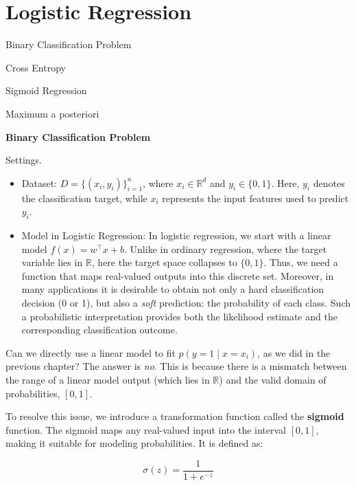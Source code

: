 \documentclass[../main]{subfiles}
\begin{document}
\chapter{Logistic Regression}
\begin{introduction}
\item Binary Classification Problem
\item Cross Entropy
\item Sigmoid Regression
\item Maximum a posteriori
\end{introduction}
\begin{example}
  \textbf{Binary Classification Problem}
\end{example}
Settings.
\begin{itemize}
  \item Dataset: $D=\{(x_i,y_i)\}_{i=1}^n$, where $x_i\in\mathbb{R}^d$ and $y_i\in\{0,1\}$.  
  Here, $y_i$ denotes the classification target, while $x_i$ represents the input features used to predict $y_i$.
  \item Model in Logistic Regression: In logistic regression, we start with a linear model $f(x) = w^\top x + b$.
  Unlike in ordinary regression, where the target variable lies in $\mathbb{R}$, here the target space collapses to $\{0,1\}$. Thus, we need a function that maps real-valued outputs into this discrete set. Moreover, in many applications it is desirable to obtain not only a hard classification decision (0 or 1), but also a \emph{soft} prediction: the probability of each class. Such a probabilistic interpretation provides both the likelihood estimate and the corresponding classification outcome.
\end{itemize}
Can we directly use a linear model to fit $p(y=1 \mid x=x_i)$, as we did in the previous chapter? The answer is \emph{no}. This is because there is a mismatch between the range of a linear model output (which lies in $\mathbb{R}$) and the valid domain of probabilities, $[0,1]$. 

To resolve this issue, we introduce a transformation function called the \textbf{sigmoid} function. The sigmoid maps any real-valued input into the interval $[0,1]$, making it suitable for modeling probabilities. It is defined as:
\begin{definition}
  \begin{equation}
    \sigma(z) = \frac{1}{1 + e^{-z}}
\end{equation}
\end{definition}
\end{document}
